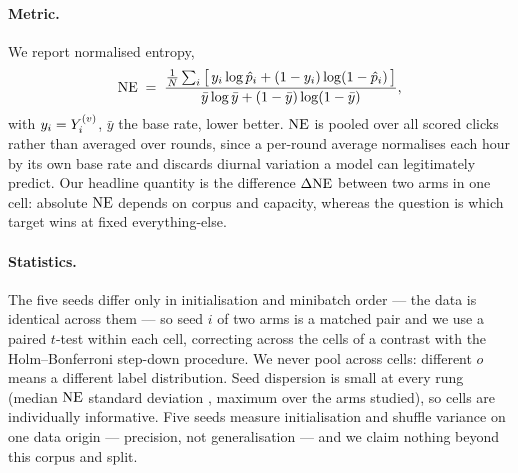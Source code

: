 \paragraph{Metric.} We report normalised entropy,
\begin{equation}
  \mathrm{NE} \;=\; \frac{\frac{1}{N}\sum_i \big[\,y_i\log \hat p_i + (1-y_i)\log(1-\hat p_i)\,\big]}
                 {\bar y\log\bar y + (1-\bar y)\log(1-\bar y)},
\end{equation}
with $y_i=Y^{(v)}_i$, $\bar y$ the base rate, lower better. $\mathrm{NE}$ is pooled over all \nEval{}
scored clicks rather than averaged over rounds, since a per-round average normalises each hour
by its own base rate and discards diurnal variation a model can legitimately predict. Our
headline quantity is the difference $\Delta\mathrm{NE}$ between two arms in one cell: absolute $\mathrm{NE}$ depends
on corpus and capacity, whereas the question is which target wins at fixed everything-else.

\paragraph{Statistics.} The five seeds differ only in initialisation and minibatch order --- the
data is identical across them --- so seed $i$ of two arms is a matched pair and we use a paired
$t$-test within each cell, correcting across the \nContrast{} cells of a contrast with the
Holm--Bonferroni step-down procedure. We never pool across cells: different $o$ means a
different label distribution. Seed dispersion is small at every rung (median $\mathrm{NE}$ standard
deviation \seedSdMed{}, maximum \seedSdMax{} over the arms studied), so cells are individually
informative. Five seeds measure initialisation and shuffle variance on one data origin ---
precision, not generalisation --- and we claim nothing beyond this corpus and split.
